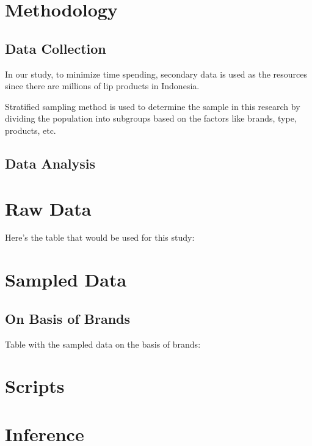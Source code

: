 \documentclass{article}
\begin{document}
          \section{Methodology}
        \subsection{Data Collection}
            In our study, to minimize time spending, secondary data is used as the resources since there are millions of lip products in Indonesia.

            \noindent Stratified sampling method is used to determine the sample in this research by dividing the population into subgroups based on the factors like brands, type, products, etc. 

        \subsection{Data Analysis}
    
    \section{Raw Data}
    Here's the table that would be used for this study:
    
    
    \section{Sampled Data}  
        \subsection{On Basis of Brands}
        Table with the sampled data on the basis of brands:  
    \section{Scripts}
    \section{Inference}

	\newpage
	
	

    \newpage
    
	
\end{document}
